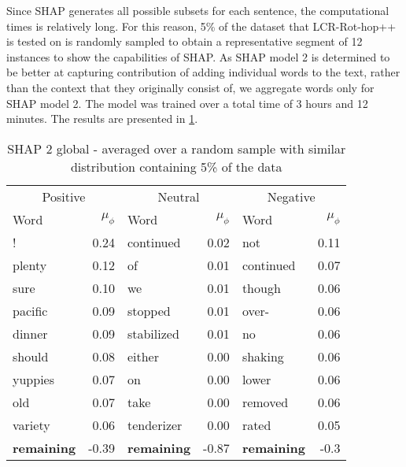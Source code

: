 Since SHAP generates all possible subsets for each sentence, the computational times is relatively long. For this reason, 5\% of the dataset that LCR-Rot-hop++ is tested on is randomly sampled to obtain a representative segment of 12 instances to show the capabilities of SHAP. As SHAP model 2 is determined to be better at capturing contribution of adding individual words to the text, rather than the context that they originally consist of, we aggregate words only for SHAP model 2. The model was trained over a total time of 3 hours and 12 minutes. The results are presented in \ref{tab:shap2_global1}.
    
\vspace{\baselineskip}
\begin{table}[ht]
\caption{SHAP 2 global - averaged over a random sample with similar distribution containing 5\% of the data}
\centering
\begin{tabular}{ l r l r l r}
\multicolumn{2}{c}{Positive} & \multicolumn{2}{c}{Neutral} & \multicolumn{2}{c}{Negative}\\
\cmidrule(lr){1-2} \cmidrule(lr){3-4} \cmidrule(lr){5-6}
Word           &   $\mu_{\phi}$    &   Word    & $\mu_{\phi}$ &   Word    & $\mu_{\phi}$\\
\cmidrule(lr){1-2}     \cmidrule(lr){3-4}     \cmidrule(lr){5-6}
!                  &   0.24    &   continued           &   0.02 & not & 0.11\\
plenty             &   0.12    &   of                  &   0.01 & continued & 0.07\\
sure               &   0.10    &   we                  &   0.01 & though & 0.06\\
pacific            &   0.09    &   stopped             &   0.01 & over- & 0.06    \\
dinner             &   0.09    &   stabilized          &   0.01 & no & 0.06    \\
should             &   0.08    &   either              &   0.00 & shaking & 0.06    \\
yuppies            &   0.07    &   on                  &   0.00 & lower & 0.06    \\
old                &   0.07    &   take                &   0.00 & removed & 0.06    \\
variety            &   0.06    &   tenderizer          &   0.00 & rated & 0.05   \\
\textbf{remaining} &   -0.39   &\textbf{remaining}     &   -0.87 & \textbf{remaining} & -0.3 \\
\bottomrule
\end{tabular}
\label{tab:shap2_global1}
\end{table}


